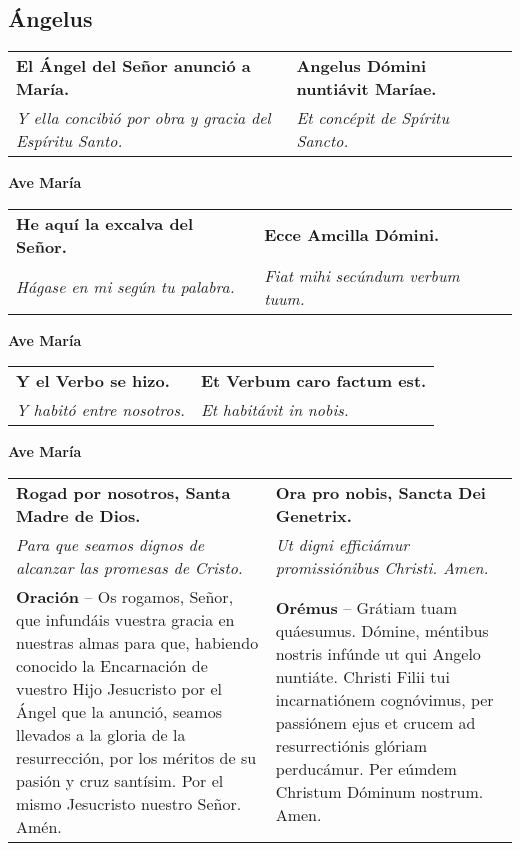 \documentclass[./devocionario.tex]{subfiles}
\begin{document}
    \subsection*{Ángelus}

    \begin{tabular} { p{} p{} }
        \textbf{El Ángel del Señor anunció a María.} & \textbf{Angelus Dómini nuntiávit Maríae.}\\
        \textit{Y ella concibió por obra y gracia del Espíritu Santo.} & 
        \textit{Et concépit de Spíritu Sancto.}
    \end{tabular}

    \begin{center}
        \textbf{Ave María}
    \end{center}

    \begin{tabular} { p{} p{} }
        \textbf{He aquí la excalva del Señor.} & \textbf{Ecce Amcilla Dómini.}\\
        \textit{Hágase en mi según tu palabra.} & 
        \textit{Fiat mihi secúndum verbum tuum.}
    \end{tabular}

    \begin{center}
        \textbf{Ave María}
    \end{center}

    \begin{tabular} { p{} p{} }
        \textbf{Y el Verbo se hizo.} & \textbf{Et Verbum caro factum est.}\\
        \textit{Y habitó entre nosotros.} & 
        \textit{Et habitávit in nobis.}
    \end{tabular}

    \begin{center}
        \textbf{Ave María}
    \end{center}

    \begin{tabular} { p{} p{} }
        \textbf{Rogad por nosotros, Santa Madre de Dios.} & \textbf{Ora pro nobis, Sancta Dei Genetrix.}\\
        \textit{Para que seamos dignos de alcanzar las promesas de Cristo.} & 
        \textit{Ut digni efficiámur promissiónibus Christi. Amen.}\\
        \textbf{Oración} -- Os rogamos, Señor, que infundáis vuestra gracia en nuestras almas para que, 
        habiendo conocido la Encarnación de vuestro Hijo Jesucristo por el Ángel que la anunció, 
        seamos llevados a la gloria de la resurrección, por los méritos de su pasión y cruz santísim. 
        Por el mismo Jesucristo nuestro Señor. Amén. & 
        \textbf{Orémus} -- Grátiam tuam quáesumus. Dómine, méntibus nostris infúnde ut qui Angelo nuntiáte. 
        Christi Filii tui incarnatiónem cognóvimus, per passiónem ejus et crucem ad resurrectiónis glóriam perducámur. 
        Per eúmdem Christum Dóminum nostrum. Amen.
    \end{tabular}
\end{document}
